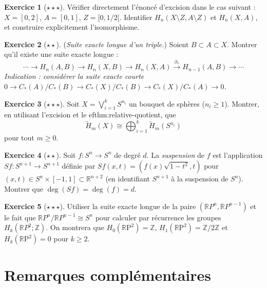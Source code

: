 \documentclass[12pt,a4paper,openany]{book}
\theoremstyle{definition}
\newtheorem{exercice}{Exercice}[chapter]
\theoremstyle{plain}
\theoremstyle{remark}
\newcommand{\Z}{\mathbb{Z}}
\newcommand{\R}{\mathbb{R}}
\newcommand{\RP}{\mathbb{R}\mathrm{P}}
\begin{document}
\begin{exercice}[$\star\star\star$]\label{exo:excision-verification}
Vérifier directement l'énoncé d'excision dans le cas suivant : $X = [0,2]$, $A = [0,1]$,
$Z = [0, 1/2[$. Identifier $H_n(X \setminus Z, A \setminus Z)$ et $H_n(X, A)$, et construire
explicitement l'isomorphisme.
\end{exercice}

\begin{exercice}[$\star\star$]\label{exo:sel-triple}
(\emph{Suite exacte longue d'un triple.})
Soient $B \subset A \subset X$. Montrer qu'il existe une suite exacte longue :
\[
  \cdots \to H_n(A, B) \to H_n(X, B) \to H_n(X, A) \xrightarrow{\partial_*} H_{n-1}(A, B) \to \cdots
\]
\emph{Indication : considérer la suite exacte courte
$0 \to C_*(A)/C_*(B) \to C_*(X)/C_*(B) \to C_*(X)/C_*(A) \to 0$.}
\end{exercice}

\begin{exercice}[$\star\star\star$]\label{exo:homologie-bouquet}
Soit $X = \bigvee_{i=1}^k S^{n_i}$ un bouquet de sphères ($n_i \geq 1$). Montrer, en utilisant
l'excision et le 
ef{thm:relative-quotient}, que
\[
  \widetilde{H}_m(X) \cong \bigoplus_{i=1}^{k} \widetilde{H}_m(S^{n_i})
\]
pour tout $m \geq 0$.
\end{exercice}

\begin{exercice}[$\star\star$]\label{exo:degre-suspension}
Soit $f \colon S^n \to S^n$ de degré $d$. La \emph{suspension} de $f$ est l'application
$Sf \colon S^{n+1} \to S^{n+1}$ définie par $Sf(x, t) = (f(x)\sqrt{1-t^2}, t)$ pour
$(x, t) \in S^n \times [-1, 1] \subset \R^{n+2}$ (en identifiant $S^{n+1}$ à la suspension de $S^n$).
Montrer que $\deg(Sf) = \deg(f) = d$.
\end{exercice}

\begin{exercice}[$\star\star\star$]\label{exo:homologie-projectif}
Utiliser la suite exacte longue de la paire $(\R P^n, \R P^{n-1})$ et le fait que
$\R P^n / \R P^{n-1} \cong S^n$ pour calculer par récurrence les groupes $H_k(\R P^2; \Z)$.
On montrera que $H_0(\RP^2) = \Z$, $H_1(\RP^2) = \Z/2\Z$ et $H_k(\RP^2) = 0$ pour $k \geq 2$.
\end{exercice}

\section{Remarques complémentaires}\label{sec:remarques-ch6}
\end{document}
